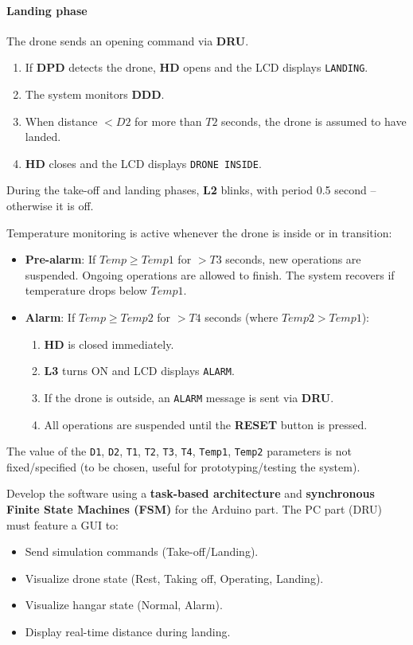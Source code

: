 \documentclass[12pt, letterpaper, twoside]{article}
\begin{document}
\paragraph{Landing phase}
The drone sends an opening command via \textbf{DRU}. 
\begin{enumerate}
    \item If \textbf{DPD} detects the drone, \textbf{HD} opens and the LCD displays \texttt{LANDING}.
    \item The system monitors \textbf{DDD}.
    \item When distance $< D2$ for more than $T2$ seconds, the drone is assumed to have landed.
    \item \textbf{HD} closes and the LCD displays \texttt{DRONE INSIDE}.
\end{enumerate}

During the take-off and landing phases, \textbf{L2} blinks, with period 0.5 second -- otherwise it is off.

Temperature monitoring is active whenever the drone is inside or in transition:
\begin{itemize}
    \item \textbf{Pre-alarm}: If $Temp \geq Temp1$ for $> T3$ seconds, new operations are suspended. Ongoing operations are allowed to finish. The system recovers if temperature drops below $Temp1$.
    \item \textbf{Alarm}: If $Temp \geq Temp2$ for $> T4$ seconds (where $Temp2 > Temp1$):
    \begin{enumerate}
        \item \textbf{HD} is closed immediately.
        \item \textbf{L3} turns ON and LCD displays \texttt{ALARM}.
        \item If the drone is outside, an \texttt{ALARM} message is sent via \textbf{DRU}.
        \item All operations are suspended until the \textbf{RESET} button is pressed.
    \end{enumerate}
\end{itemize}

The value of the \texttt{D1}, \texttt{D2}, \texttt{T1}, \texttt{T2}, \texttt{T3}, \texttt{T4}, \texttt{Temp1}, \texttt{Temp2} parameters is not fixed/specified (to be chosen, useful for prototyping/testing the system).

Develop the software using a \textbf{task-based architecture} and \textbf{synchronous Finite State Machines (FSM)} for the Arduino part. The PC part (DRU) must feature a GUI to:
\begin{itemize}
    \item Send simulation commands (Take-off/Landing).
    \item Visualize drone state (Rest, Taking off, Operating, Landing).
    \item Visualize hangar state (Normal, Alarm).
    \item Display real-time distance during landing.
\end{itemize}
\end{document}
